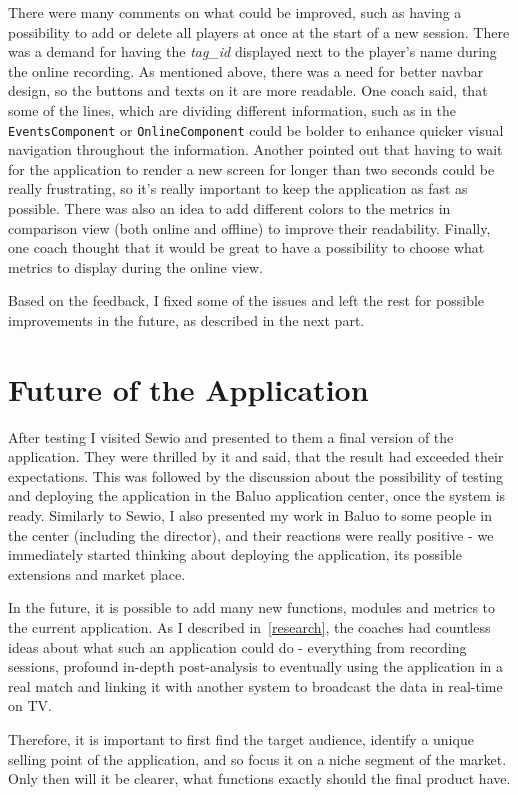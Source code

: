 There were many comments on what could be improved, such as having a possibility to add or delete all players at once at the start of a new session. There was a demand for having the \textit{tag\_id} displayed next to the player’s name during the online recording. As mentioned above, there was a need for better navbar design, so the buttons and texts on it are more readable. One coach said, that some of the lines, which are dividing different information, such as in the \texttt{EventsComponent} or \texttt{OnlineComponent} could be bolder to enhance quicker visual navigation throughout the information. Another pointed out that having to wait for the application to render a new screen for longer than two seconds could be really frustrating, so it’s really important to keep the application as fast as possible. There was also an idea to add different colors to the metrics in comparison view (both online and offline) to improve their readability. Finally, one coach thought that it would be great to have a possibility to choose what metrics to display during the online view.

Based on the feedback, I fixed some of the issues and left the rest for possible improvements in the future, as described in the next part.

\section{Future of the Application}
After testing I visited Sewio and presented to them a final version of the application. They were thrilled by it and said, that the result had exceeded their expectations. This was followed by the discussion about the possibility of testing and deploying the application in the Baluo application center, once the system is ready. Similarly to Sewio, I also presented my work in Baluo to some people in the center (including the director), and their reactions were really positive - we immediately started thinking about deploying the application, its possible extensions and market place.

In the future, it is possible to add many new functions, modules and metrics to the current application. As I described in~\ref{research}, the coaches had countless ideas about what such an application could do - everything from recording sessions, profound in-depth post-analysis to eventually using the application in a real match and linking it with another system to broadcast the data in real-time on TV.

Therefore, it is important to first find the target audience, identify a unique selling point of the application, and so focus it on a niche segment of the market. Only then will it be clearer, what functions exactly should the final product have.

